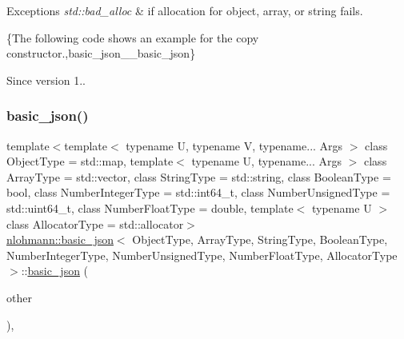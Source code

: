 \begin{DoxyExceptions}{Exceptions}
{\em std\+::bad\+\_\+alloc} & if allocation for object, array, or string fails.\\
\hline
\end{DoxyExceptions}
\{The following code shows an example for the copy constructor.,basic\+\_\+json\+\_\+\+\_\+basic\+\_\+json\}

\begin{DoxySince}{Since}
version 1.. 
\end{DoxySince}
\hypertarget{classnlohmann_1_1basic__json_a73e150cbcba5643cb89de8f515eb64e2}{}\label{classnlohmann_1_1basic__json_a73e150cbcba5643cb89de8f515eb64e2} 
\subsubsection{\texorpdfstring{basic\+\_\+json()}{basic\_json()}\hspace{0.1cm}{\footnotesize\ttfamily [23/23]}}
{\footnotesize\ttfamily template$<$template$<$ typename U, typename V, typename... Args $>$ class Object\+Type = std\+::map, template$<$ typename U, typename... Args $>$ class Array\+Type = std\+::vector, class String\+Type  = std\+::string, class Boolean\+Type  = bool, class Number\+Integer\+Type  = std\+::int64\+\_\+t, class Number\+Unsigned\+Type  = std\+::uint64\+\_\+t, class Number\+Float\+Type  = double, template$<$ typename U $>$ class Allocator\+Type = std\+::allocator$>$ \\
\hyperlink{classnlohmann_1_1basic__json}{nlohmann\+::basic\+\_\+json}$<$ Object\+Type, Array\+Type, String\+Type, Boolean\+Type, Number\+Integer\+Type, Number\+Unsigned\+Type, Number\+Float\+Type, Allocator\+Type $>$\+::\hyperlink{classnlohmann_1_1basic__json}{basic\+\_\+json} (\begin{DoxyParamCaption}\item[{\hyperlink{classnlohmann_1_1basic__json}{basic\+\_\+json}$<$ Object\+Type, Array\+Type, String\+Type, Boolean\+Type, Number\+Integer\+Type, Number\+Unsigned\+Type, Number\+Float\+Type, Allocator\+Type $>$ \&\&}]{other }\end{DoxyParamCaption})\hspace{0.3cm}{\ttfamily [inline]}, {\ttfamily [noexcept]}}




